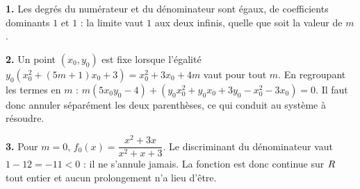 \begin{corrige}
\textbf{1.} Les degrés du numérateur et du dénominateur sont égaux, de
coefficients dominants $1$ et $1$ : la limite vaut $1$ aux deux infinis, quelle
que soit la valeur de $m$.

\textbf{2.} Un point $(x_{0}, y_{0})$ est fixe lorsque l'égalité
$y_{0}\left(x_{0}^{2} + (5m+1)x_{0} + 3\right) = x_{0}^{2} + 3x_{0} + 4m$ vaut
pour tout $m$. En regroupant les termes en $m$ :
$m\left(5x_{0}y_{0} - 4\right) + \left(y_{0}x_{0}^{2} + y_{0}x_{0} + 3y_{0} - x_{0}^{2} - 3x_{0}\right) = 0$.
Il faut donc annuler séparément les deux parenthèses, ce qui conduit au
système à résoudre.

\textbf{3.} Pour $m = 0$, $f_{0}(x) = \dfrac{x^{2}+3x}{x^{2}+x+3}$. Le
discriminant du dénominateur vaut $1 - 12 = -11 < 0$ : il ne s'annule jamais.
La fonction est donc continue sur $R$ tout entier et aucun prolongement n'a
lieu d'être.
\end{corrige}

